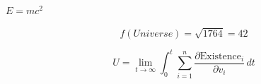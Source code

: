 $E=mc^2$


\begin{equation}
	f(Universe) = \sqrt{1764} = 42
\end{equation}

$$ U = \lim_{t \to \infty} \int_{0}^{t} \sum_{i=1}^{n} \frac{\partial \text{Existence}_i}{\partial v_i} \, dt $$